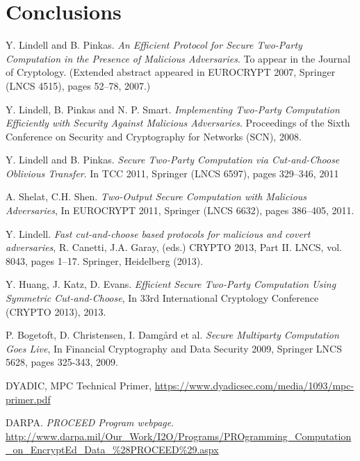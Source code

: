 \documentclass[ %
                    author={Nicholas Tutte},
                supervisor={Prof. Nigel Smart},
                    degree={MEng},
                     title={Secure Two Party Computation},
                  subtitle={A practical comparison of recent protocols},
                      type={Research - GG1K},
                      year={2015} ]{dissertation}
\begin{document}
				


	\chapter{Conclusions}

		

	\begin{thebibliography}{99}

			Y. Lindell and B. Pinkas. \emph{An Efficient Protocol for Secure Two-Party Computation in the Presence of Malicious Adversaries}.
			To appear in the Journal of Cryptology. (Extended abstract appeared in EUROCRYPT 2007, Springer (LNCS 4515), pages 52–78, 2007.)

			Y. Lindell, B. Pinkas and N. P. Smart.
			\emph{Implementing Two-Party Computation Efficiently with Security Against Malicious Adversaries}. Proceedings of the Sixth Conference on Security and Cryptography for Networks (SCN),
			2008.

			Y. Lindell and B. Pinkas. \emph{Secure Two-Party Computation via Cut-and-Choose Oblivious Transfer}.
			In TCC 2011,
			Springer (LNCS 6597), pages 329–346,
			2011

			A. Shelat, C.H. Shen. \emph{Two-Output Secure Computation with Malicious Adversaries},
			In EUROCRYPT 2011,
			Springer (LNCS 6632), pages 386–405,
			2011.

			Y. Lindell.
			\emph{Fast cut-and-choose based protocols for malicious and covert adversaries}, R. Canetti, J.A. Garay, (eds.)
			CRYPTO 2013, Part II. LNCS, vol. 8043, pages 1–17.
			Springer, Heidelberg (2013).

			Y. Huang, J. Katz, D. Evans.
			\emph{Efficient Secure Two-Party Computation Using Symmetric Cut-and-Choose}, In 33rd International Cryptology Conference (CRYPTO 2013),
			2013.

			P. Bogetoft, D. Christensen, I. Damgård et al.
			\emph{Secure Multiparty Computation Goes Live},
			In Financial Cryptography and Data Security 2009,
			Springer LNCS 5628, pages 325-343,
			2009.

			DYADIC,
			MPC Technical Primer,
			\url{https://www.dyadicsec.com/media/1093/mpc-primer.pdf}

			DARPA.
			\emph{PROCEED Program webpage}.
			\url{http://www.darpa.mil/Our_Work/I2O/Programs/PROgramming_Computation_on_EncryptEd_Data_%28PROCEED%29.aspx}


\end{thebibliography}
\end{document}
